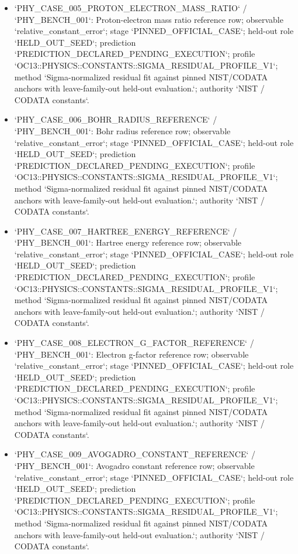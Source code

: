 \begin{itemize}
\item `PHY\_CASE\_005\_PROTON\_ELECTRON\_MASS\_RATIO` / `PHY\_BENCH\_001`: Proton-electron mass ratio reference row; observable `relative\_constant\_error`; stage `PINNED\_OFFICIAL\_CASE`; held-out role `HELD\_OUT\_SEED`; prediction `PREDICTION\_DECLARED\_PENDING\_EXECUTION`; profile `OC13::PHYSICS::CONSTANTS::SIGMA\_RESIDUAL\_PROFILE\_V1`; method `Sigma-normalized residual fit against pinned NIST/CODATA anchors with leave-family-out held-out evaluation.`; authority `NIST / CODATA constants`.
\item `PHY\_CASE\_006\_BOHR\_RADIUS\_REFERENCE` / `PHY\_BENCH\_001`: Bohr radius reference row; observable `relative\_constant\_error`; stage `PINNED\_OFFICIAL\_CASE`; held-out role `HELD\_OUT\_SEED`; prediction `PREDICTION\_DECLARED\_PENDING\_EXECUTION`; profile `OC13::PHYSICS::CONSTANTS::SIGMA\_RESIDUAL\_PROFILE\_V1`; method `Sigma-normalized residual fit against pinned NIST/CODATA anchors with leave-family-out held-out evaluation.`; authority `NIST / CODATA constants`.
\item `PHY\_CASE\_007\_HARTREE\_ENERGY\_REFERENCE` / `PHY\_BENCH\_001`: Hartree energy reference row; observable `relative\_constant\_error`; stage `PINNED\_OFFICIAL\_CASE`; held-out role `HELD\_OUT\_SEED`; prediction `PREDICTION\_DECLARED\_PENDING\_EXECUTION`; profile `OC13::PHYSICS::CONSTANTS::SIGMA\_RESIDUAL\_PROFILE\_V1`; method `Sigma-normalized residual fit against pinned NIST/CODATA anchors with leave-family-out held-out evaluation.`; authority `NIST / CODATA constants`.
\item `PHY\_CASE\_008\_ELECTRON\_G\_FACTOR\_REFERENCE` / `PHY\_BENCH\_001`: Electron g-factor reference row; observable `relative\_constant\_error`; stage `PINNED\_OFFICIAL\_CASE`; held-out role `HELD\_OUT\_SEED`; prediction `PREDICTION\_DECLARED\_PENDING\_EXECUTION`; profile `OC13::PHYSICS::CONSTANTS::SIGMA\_RESIDUAL\_PROFILE\_V1`; method `Sigma-normalized residual fit against pinned NIST/CODATA anchors with leave-family-out held-out evaluation.`; authority `NIST / CODATA constants`.
\item `PHY\_CASE\_009\_AVOGADRO\_CONSTANT\_REFERENCE` / `PHY\_BENCH\_001`: Avogadro constant reference row; observable `relative\_constant\_error`; stage `PINNED\_OFFICIAL\_CASE`; held-out role `HELD\_OUT\_SEED`; prediction `PREDICTION\_DECLARED\_PENDING\_EXECUTION`; profile `OC13::PHYSICS::CONSTANTS::SIGMA\_RESIDUAL\_PROFILE\_V1`; method `Sigma-normalized residual fit against pinned NIST/CODATA anchors with leave-family-out held-out evaluation.`; authority `NIST / CODATA constants`.

\end{itemize}
